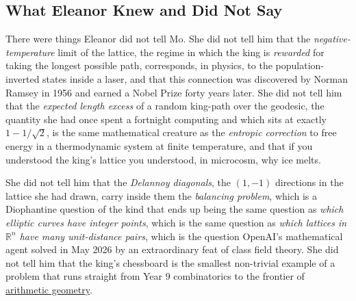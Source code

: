 %  
%  
%  
%  
%  
\subsection*{What Eleanor Knew and Did Not Say}
 
There were things Eleanor did not tell Mo. She did not tell him that the \emph{negative-temperature} limit of
the lattice, the regime in which the king is \emph{rewarded} for
taking the longest possible path, corresponds, in physics, to the
population-inverted states inside a laser, and that this connection
was discovered by Norman Ramsey in 1956 and earned a Nobel Prize
forty years later. She did not tell him that the \emph{expected
length excess} of a random king-path over the geodesic, the
quantity she had once spent a fortnight computing and which sits at
exactly $1 - 1/\sqrt{2}$, is the same mathematical creature as the
\emph{entropic correction} to free energy in a thermodynamic system
at finite temperature, and that if you understood the king's
lattice you understood, in microcosm, why ice melts.
 
She did not tell him that the \emph{Delannoy diagonals}, the $(1, -1)$ directions in the lattice she had drawn, carry inside them the \emph{balancing problem}, which is a Diophantine question of the kind that ends up being the same question as \emph{which elliptic curves have integer points}, which is the same question as
\emph{which lattices in $\mathbb{R}^n$ have many unit-distance pairs}, which is the question OpenAI's mathematical agent solved in May 2026 by an extraordinary feat of class field theory. She did
not tell him that the king's chessboard is the smallest non-trivial example of a problem that runs straight from Year 9 combinatorics to the frontier of \href{https://leelemacjames.github.io/3d_dellanoy.pdf}{arithmetic geometry}.
 
